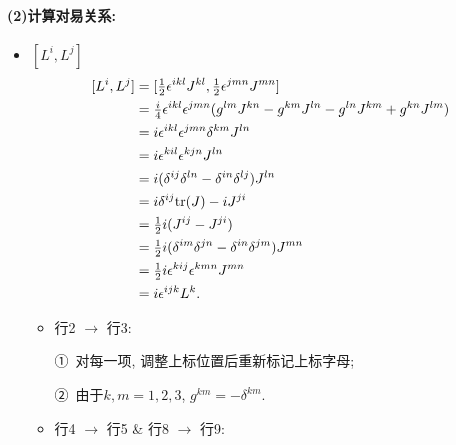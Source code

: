 \paragraph*{(2)计算对易关系: }
\begin{itemize}
  \item $[L^i, L^j]$
        \begin{equation}
          \begin{aligned}
            \relax[L^i, L^j] & = [\tfrac{1}{2}\epsilon^{ikl}J^{kl}, \tfrac{1}{2}\epsilon^{jmn}J^{mn}]                                \\
                             & = \tfrac{i}{4}\epsilon^{ikl}\epsilon^{jmn}(g^{lm}J^{kn} - g^{km}J^{ln} - g^{ln}J^{km} + g^{kn}J^{lm}) \\
                             & = i\epsilon^{ikl}\epsilon^{jmn}\delta^{km}J^{ln}                                                      \\
                             & = i\epsilon^{kil}\epsilon^{kjn}J^{ln}                                                                 \\
                             & = i(\delta^{ij}\delta^{ln}-\delta^{in}\delta^{lj})J^{ln}                                              \\
                             & = i\delta^{ij}{\rm tr}(J) - iJ^{ji}                                                                   \\
                             & = \tfrac{1}{2}i(J^{ij} - J^{ji})                                                                      \\
                             & = \tfrac{1}{2}i(\delta^{im}\delta^{jn}-\delta^{in}\delta^{jm})J^{mn}                                  \\
                             & = \tfrac{1}{2}i\epsilon^{kij}\epsilon^{kmn}J^{mn}                                                     \\
                             & = i\epsilon^{ijk}L^k.
          \end{aligned}
        \end{equation}
        \begin{itemize}
          \item 行2 $\rightarrow$ 行3:

                \quad ①\ 对每一项, 调整上标位置后重新标记上标字母;

                \quad ②\ 由于$k, m = 1, 2, 3$, $g^{km} = -\delta^{km}$.
          \item 行4 $\rightarrow$ 行5 \& 行8 $\rightarrow$ 行9:


\end{itemize}
\end{itemize}
